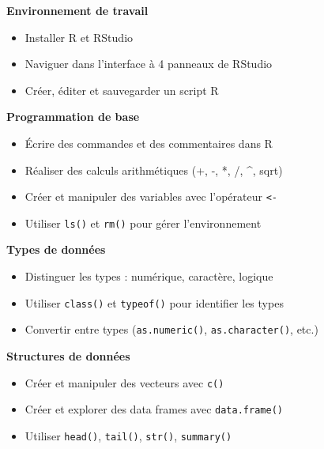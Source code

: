 \documentclass[
  french,
  11pt,
  a4paper,
]{article}
\providecommand{\tightlist}{%
  \setlength{\itemsep}{0pt}\setlength{\parskip}{0pt}}
\begin{document}
\begin{tcolorbox}[enhanced jigsaw, arc=.35mm, bottomrule=.15mm, bottomtitle=1mm, breakable, colback=white, colbacktitle=quarto-callout-note-color!10!white, colframe=quarto-callout-note-color-frame, coltitle=black, left=2mm, leftrule=.75mm, opacityback=0, opacitybacktitle=0.6, rightrule=.15mm, title=\textcolor{quarto-callout-note-color}{\faInfo}\hspace{0.5em}{Ce que vous avez appris aujourd'hui}, titlerule=0mm, toprule=.15mm, toptitle=1mm]

\textbf{Environnement de travail}

\begin{itemize}
\tightlist
\item
  Installer R et RStudio
\item
  Naviguer dans l'interface à 4 panneaux de RStudio
\item
  Créer, éditer et sauvegarder un script R
\end{itemize}

\textbf{Programmation de base}

\begin{itemize}
\tightlist
\item
  Écrire des commandes et des commentaires dans R
\item
  Réaliser des calculs arithmétiques (+, -, *, /, \^{}, sqrt)
\item
  Créer et manipuler des variables avec l'opérateur
  \texttt{\textless{}-}
\item
  Utiliser \texttt{ls()} et \texttt{rm()} pour gérer l'environnement
\end{itemize}

\textbf{Types de données}

\begin{itemize}
\tightlist
\item
  Distinguer les types : numérique, caractère, logique
\item
  Utiliser \texttt{class()} et \texttt{typeof()} pour identifier les
  types
\item
  Convertir entre types (\texttt{as.numeric()}, \texttt{as.character()},
  etc.)
\end{itemize}

\textbf{Structures de données}

\begin{itemize}
\tightlist
\item
  Créer et manipuler des vecteurs avec \texttt{c()}
\item
  Créer et explorer des data frames avec \texttt{data.frame()}
\item
  Utiliser \texttt{head()}, \texttt{tail()}, \texttt{str()},
  \texttt{summary()}
\end{itemize}


\end{tcolorbox}
\end{document}
